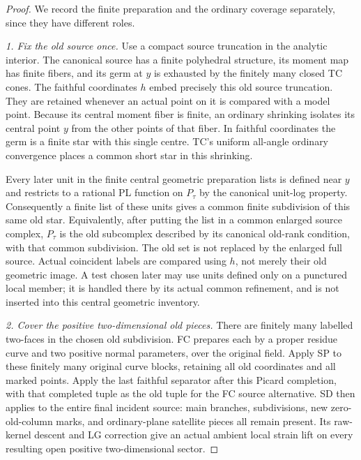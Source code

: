 \begin{proof}
We record the finite preparation and the ordinary coverage
separately, since they have different roles.

\emph{1. Fix the old source once.}
Use a compact source truncation in the analytic interior.  The
canonical source has a finite polyhedral structure, its moment
map has finite fibers, and its germ at $y$ is exhausted by the
finitely many closed TC cones.  The faithful coordinates $h$
embed precisely this old source truncation.  They are retained
whenever an actual point on it is compared with a model point.
Because its central moment fiber is finite, an ordinary
shrinking isolates its central point $y$ from the other points
of that fiber.  In faithful coordinates the germ is a finite
star with this single centre.  TC's uniform all-angle ordinary
convergence places a common short star in this shrinking.

Every later unit in the finite central geometric preparation
lists is defined near $y$ and restricts to a rational PL
function on $P_\tau$ by the canonical unit-log property.
Consequently a finite list of these units gives a common finite
subdivision of this same old star.  Equivalently, after putting
the list in a common enlarged source complex, $P_\tau$ is the
old subcomplex described by its canonical old-rank condition,
with that common subdivision.  The old set is not replaced by
the enlarged full source.  Actual coincident labels are compared
using $h$, not merely their old geometric image.  A test chosen
later may use units defined only on a punctured local member;
it is handled there by its actual common refinement, and is not
inserted into this central geometric inventory.

\emph{2. Cover the positive two-dimensional old pieces.}
There are finitely many labelled two-faces in the chosen old
subdivision.  FC prepares each by a proper residue curve and
two positive normal parameters, over the original field.  Apply
SP to these finitely many original curve blocks, retaining all
old coordinates and all marked points.  Apply the last faithful
separator after this Picard completion, with that completed tuple
as the old tuple for the FC source alternative.  SD then applies
to the entire final incident source: main branches, subdivisions,
new zero-old-column marks, and ordinary-plane satellite pieces
all remain present.  Its raw-kernel descent and LG correction
give an actual ambient local strain lift on every resulting
open positive two-dimensional sector.


\end{proof}
